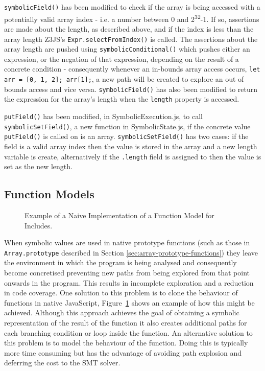 \documentclass[]{final_report}
\begin{document}
\lstinline|symbolicField()| has been modified to check if the array is being accessed with a potentially valid array index - i.e. a number between 0 and 2\textsuperscript{32}-1. If so, assertions are made about the length, as described above, and if the index is less than the array length Z3JS’s \lstinline|Expr.selectFromIndex()| is called. The assertions about the array length are pushed using \lstinline|symbolicConditional()| which pushes either an expression, or the negation of that expression, depending on the result of a concrete condition - consequently whenever an in-bounds array access occurs, \lstinline|let arr = [0, 1, 2]; arr[1];|, a new path will be created to explore an out of bounds access and vice versa. \lstinline|symbolicField()| has also been modified to return the expression for the array's length when the \lstinline|length| property is accessed.

\lstinline|putField()| has been modified, in SymbolicExecution.js, to call \lstinline|symbolicSetField()|, a new function in SymbolicState.js, if the concrete value \lstinline|putField()| is called on is an array. \lstinline|symbolicSetField()| has two cases: if the field is a valid array index then the value is stored in the array and a new length variable is create, alternatively if the \lstinline|.length| field is assigned to then the value is set as the new length.

\subsection{Function Models}
\begin{figure}[t]

\caption{\label{fig:naive-includes} Example of a Naive Implementation of a Function Model for Includes.}
\end{figure}

When symbolic values are used in native prototype functions (such as those in \lstinline{Array.prototype} described in Section \ref{sec:array-prototype-functions}) they leave the environment in which the program is being analysed and consequently become concretised preventing new paths from being explored from that point onwards in the program. This results in incomplete exploration and a reduction in code coverage. One solution to this problem is to clone the behaviour of functions in native JavaScript, Figure~\ref{fig:naive-includes} shows an example of how this might be achieved. Although this approach achieves the goal of obtaining a symbolic representation of the result of the function it also creates additional paths for each branching condition or loop inside the function. An alternative solution to this problem is to model the behaviour of the function. Doing this is typically more time consuming but has the advantage of avoiding path explosion and deferring the cost to the SMT solver.
\end{document}

